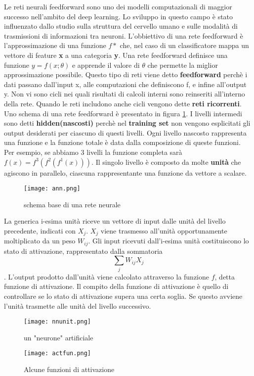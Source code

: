 Le reti neurali feedforward sono uno dei modelli computazionali di maggior successo nell'ambito del deep learning. Lo sviluppo in questo campo è stato influenzato  dallo
studio sulla struttura del cervello umano e sulle modalità di trasmissioni di informazioni tra neuroni. L'obbiettivo di una rete feedforward  è l'approssimazione di una funzione $f*$ che, nel caso di un classificatore mappa
un vettore di feature \textbf{x} a una categoria \textbf{y}. Una rete feedforward definisce una funzione $y=f(x;\theta)$ e apprende il valore di $\theta$ che permette
la miglior approssimazione possibile. Questo tipo di reti viene detto \textbf{feedforward} perchè i dati passano dall'input x, alle computazioni che definiscono f, e infine all'output y. Non vi sono cicli 
nei quali risultati di calcoli interni sono reinseriti all'interno della rete. Quando le reti includono anche cicli vengono dette \textbf{reti ricorrenti}.
Uno schema di una rete feedforward  è presentato in figura \ref{fig:ann}. I livelli intermedi sono detti \textbf{hidden(nascosti)} perchè nel \textbf{training set} non vengono esplicitati
gli output desiderati  per ciascuno di questi livelli. Ogni livello nascosto rappresenta una funzione e la funzione totale è data dalla composizione di queste funzioni. Per esempio,
se abbiamo 3 livelli la funzione completa sarà $f(x) = f^{3}(f^{2}(f^{1}(x)))$. Il singolo livello è composto da molte \textbf{unità} che agiscono in parallelo, ciascuna rappresentante una funzione da vettore a scalare\cite{bengio}.
\begin{figure}
  \texttt{[image: ann.png]}
  \caption{schema base di una rete neurale\cite{ann}}
  \label{fig:ann}
\end{figure}

La generica i-esima unità  riceve un vettore di input dalle unità del livello precedente, indicati con $X_j$. $X_j$ viene trasmesso all'unità opportunamente moltiplicato da un peso $W_{ij}$.
Gli input ricevuti dall'i-esima unità costituiscono lo stato di attivazione, rappresentato dalla sommatoria \[\sum_jW_{ij}X_j\]. L'output prodotto dall'unità viene calcolato attraverso la funzione $f$, detta funzione di attivazione. Il compito della funzione di attivazione è quello di controllare
se lo stato di attivazione supera una certa soglia. Se questo avviene l'unità trasmette alle unità del livello successivo\cite{mazzetti}.
\begin{figure}
  \texttt{[image: nnunit.png]}
  \caption{un "neurone" artificiale \cite{unit}}
  \label{fig::unit}
\end{figure}
\begin{figure}
  \texttt{[image: actfun.png]}
  \caption{Alcune funzioni di attivazione\cite{act}}
  \label{fig:act}
\end{figure}

